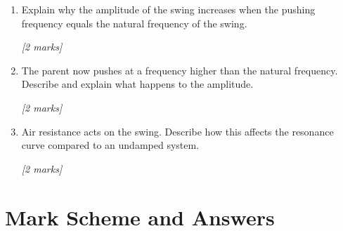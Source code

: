\begin{tcolorbox}[colback=white, colframe=midblue, breakable]
\begin{minipage}{\linewidth}
\begin{enumerate}[label=(\alph*)]
  \item Explain why the amplitude of the swing increases when the pushing frequency equals the natural frequency of the swing.
  \par\hfill\textit{[2 marks]}
  \vspace{3cm}

  \item The parent now pushes at a frequency higher than the natural frequency. Describe and explain what happens to the amplitude.
  \par\hfill\textit{[2 marks]}
  \vspace{3cm}

  \item Air resistance acts on the swing. Describe how this affects the resonance curve compared to an undamped system.
  \par\hfill\textit{[2 marks]}
  \vspace{3cm}
\end{enumerate}
\end{minipage}

\end{tcolorbox}

\section{Mark Scheme and Answers}

